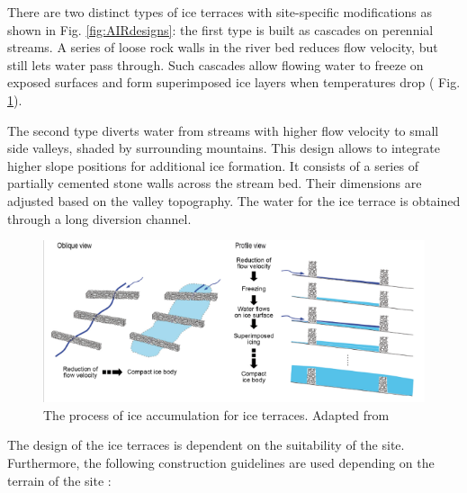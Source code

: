 There are two distinct types of ice terraces with site-specific modifications as shown in Fig.
\ref{fig:AIRdesigns}: the first type is built as cascades on perennial streams. A series of loose rock walls in
the river bed reduces flow velocity, but still lets water pass through. Such cascades allow flowing water to
freeze on exposed surfaces and form superimposed ice layers when temperatures drop ( Fig.
\ref{fig:ITscience}).

The second type diverts water from streams with higher flow velocity to small side valleys, shaded by
surrounding mountains. This design allows to integrate higher slope positions for additional ice formation. It
consists of a series of partially cemented stone walls across the stream bed. Their dimensions are adjusted
based on the valley topography. The water for the ice terrace is obtained through a long diversion channel.

\begin{figure}[htb]
\centering
\includegraphics[width=\textwidth]{figs/IT_science.png}

\caption{ The process of ice accumulation for ice terraces. Adapted from
\citep{nusserSociohydrologyArtificialGlaciers2019}}

\label{fig:ITscience}
\end{figure}

The design of the ice terraces is dependent on the suitability of the
site. Furthermore, the following construction guidelines are used depending on the terrain of the site
\citep{norphelSnowWaterHarvesting2015}:

